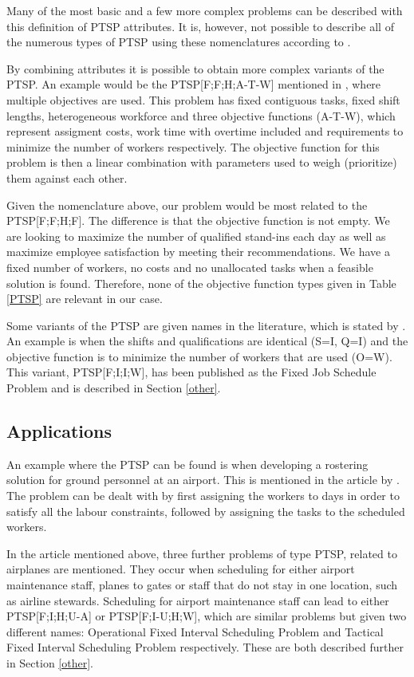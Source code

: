 Many of the most basic and a few more complex problems can be described with this definition of PTSP attributes. It is, however, not possible to describe all of the numerous types of PTSP using these nomenclatures according to \citet{krishnamoorthy_2001}.

By combining attributes it is possible to obtain more complex variants of the PTSP. An example would be the PTSP[F;F;H;A-T-W] mentioned in \citet{krishnamoorthy_2001}, where multiple objectives are used. This problem has fixed contiguous tasks, fixed shift lengths, heterogeneous workforce and three objective functions (A-T-W), which represent assigment costs, work time with overtime included and requirements to minimize the number of workers respectively. The objective function for this problem is then a linear combination with parameters used to weigh (prioritize) them against each other.

Given the nomenclature above, our problem would be most related to the PTSP[F;F;H;F]. The difference is that the objective function is not empty. We are looking to maximize the number of qualified stand-ins each day as well as maximize employee satisfaction by meeting their recommendations. We have a fixed number of workers, no costs and no unallocated tasks when a feasible solution is found. Therefore, none of the objective function types given in Table \ref{PTSP} are relevant in our case.

Some variants of the PTSP are given names in the literature, which is stated by \citet{krishnamoorthy_2001}. An example is when the shifts and qualifications are identical (S=I, Q=I) and the objective function is to minimize the number of workers that are used (O=W). This variant, PTSP[F;I;I;W], has been published as the Fixed Job Schedule Problem and is described in Section \ref{other}.

\subsection{Applications}
An example where the PTSP can be found is when developing a rostering solution for ground personnel at an airport. This is mentioned in the article by \citet{krishnamoorthy_2001}. The problem can be dealt with by first assigning the workers to days in order to satisfy all the labour constraints, followed by assigning the tasks to the scheduled workers.

In the article mentioned above, three further problems of type PTSP, related to airplanes are mentioned. They occur when scheduling for either airport maintenance staff, planes to gates or staff that do not stay in one location, such as airline stewards. Scheduling for airport maintenance staff can lead to either PTSP[F;I;H;U-A] or PTSP[F;I-U;H;W], which are similar problems but given two different names: Operational Fixed Interval Scheduling Problem and Tactical Fixed Interval Scheduling Problem respectively. These are both described further in Section \ref{other}. 

